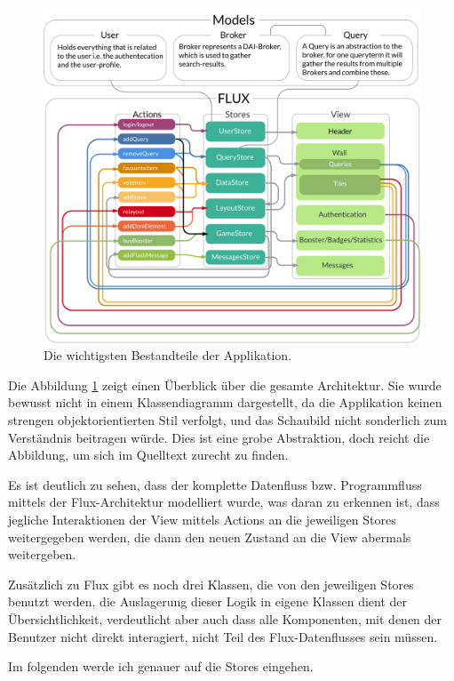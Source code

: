 \documentclass[12pt,twoside]{book}
\begin{document}
\begin{figure}[htbp]
    \centering
    \includegraphics[width=1.0\textwidth]{images/architecture.pdf}
    \caption{Die wichtigsten Bestandteile der Applikation.}
    \label{fig:architecture}
\end{figure}

Die Abbildung \ref{fig:architecture} zeigt einen Überblick über die gesamte Architektur. Sie wurde bewusst nicht in einem Klassendiagramm dargestellt, da die Applikation keinen strengen objektorientierten Stil verfolgt, und das Schaubild nicht sonderlich zum Verständnis beitragen würde. Dies ist eine grobe Abstraktion, doch reicht die Abbildung, um sich im Quelltext zurecht zu finden.

Es ist deutlich zu sehen, dass der komplette Datenfluss bzw. Programmfluss mittels der Flux-Architektur modelliert wurde, was daran zu erkennen ist, dass jegliche Interaktionen der View mittels Actions an die jeweiligen Stores weitergegeben werden, die dann den neuen Zustand an die View abermals weitergeben.

Zusätzlich zu Flux gibt es noch drei Klassen, die von den jeweiligen Stores benutzt werden, die Auslagerung dieser Logik in eigene Klassen dient der Übersichtlichkeit, verdeutlicht aber auch dass alle Komponenten, mit denen der Benutzer nicht direkt interagiert, nicht Teil des Flux-Datenflusses sein müssen.

Im folgenden werde ich genauer auf die Stores eingehen.
\end{document}
